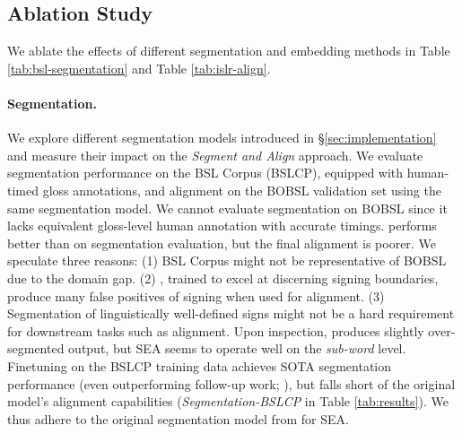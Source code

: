 \documentclass[11pt]{article}
\newcommand{\fix}[1]{\textcolor{red}{#1}}
\begin{document}
\subsection{Ablation Study}
\label{sec:ablation}

We ablate the effects of different segmentation and embedding methods in Table \ref{tab:bsl-segmentation} and Table \ref{tab:islr-align}.




\paragraph{Segmentation.} We explore different segmentation models introduced in \S\ref{sec:implementation} and measure their impact on the \textit{Segment and Align} approach. We evaluate segmentation performance on the BSL Corpus (BSLCP), equipped with human-timed gloss annotations, and alignment on the BOBSL validation set using the same segmentation model. 
We cannot evaluate segmentation on BOBSL since it lacks equivalent gloss-level human annotation with accurate timings. 
\citet{Renz2021signsegmentation_a,Renz2021signsegmentation_b} performs better than \citet{moryossef-etal-2023-linguistically} on segmentation evaluation, but the final alignment is poorer.
We speculate three reasons:
(1) BSL Corpus might not be representative of BOBSL due to the domain gap.
(2) \citet{Renz2021signsegmentation_a,Renz2021signsegmentation_b}, trained to excel at discerning signing boundaries, produce many false positives of signing when used for alignment.
(3) Segmentation of linguistically well-defined signs might not be a hard requirement for downstream tasks such as alignment. Upon inspection, \citet{moryossef-etal-2023-linguistically} produces slightly over-segmented output, but SEA seems to operate well on the \textit{sub-word} \cite{sennrich-etal-2016-neural} level.
Finetuning \citet{moryossef-etal-2023-linguistically} on the BSLCP training data achieves SOTA segmentation performance (even outperforming follow-up work; \citet{he2025hands}), but falls short of the original model's alignment capabilities (\textit{Segmentation-BSLCP} in Table \ref{tab:results}). 
We thus adhere to the original segmentation model from \citet{moryossef-etal-2023-linguistically} for SEA.
\end{document}
